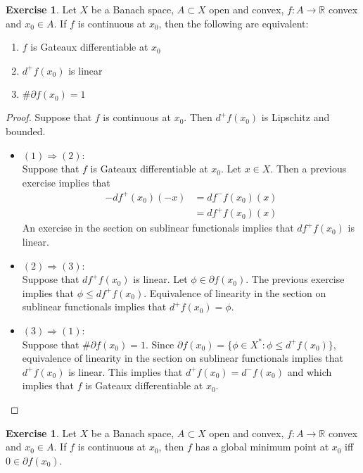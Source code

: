 \documentclass[12pt]{amsart}
\theoremstyle{definition}
\theoremstyle{remark}
\theoremstyle{definition}
\newtheorem{ex}[definition]{Exercise}
\newcommand{\R}{\mathbb{R}}
\newcommand{\p}{\partial}
\begin{document}
	\begin{ex}
	Let $X$ be a Banach space, $A \subset X$ open and convex, $f:A \rightarrow \R$ convex and $x_0 \in A$. If $f$ is continuous at $x_0$, then the following are equivalent:
	\begin{enumerate}
	\item $f$ is Gateaux differentiable at $x_0$    
	\item $d^+f(x_0)$ is linear 
	\item $\# \p f(x_0) = 1$
	\end{enumerate}
	\end{ex}	
	
	\begin{proof}
	Suppose that $f$ is continuous at $x_0$. Then $d^+f(x_0)$ is Lipschitz and bounded.
	\begin{itemize}
	\item $(1) \Rightarrow (2)$: \\ 
	Suppose that $f$ is Gateaux differentiable at $x_0$. Let $x \in X$. Then a previous exercise implies that 
	\begin{align*}
	-df^+(x_0)(-x) 
	&= df^-f(x_0)(x) \\
	&= df^+f(x_0)(x)
	\end{align*}
	An exercise in the section on sublinear functionals implies that $df^+f(x_0)$ is linear.
	\item $(2) \Rightarrow (3)$: \\  
	Suppose that $df^+f(x_0)$ is linear. Let $\phi \in \p f(x_0)$. The previous exercise implies that $\phi \leq df^+f(x_0)$. Equivalence of linearity in the section on sublinear functionals implies that $d^+f(x_0) = \phi$. 
	\item $(3) \Rightarrow (1)$: \\  
	Suppose that $\# \p f(x_0) = 1$. Since $\p f(x_0) = \{ \phi \in X^*: \phi \leq d^+ f(x_0) \}$, equivalence of linearity in the section on sublinear functionals implies that $d^+ f(x_0)$ is linear. This implies that $d^+ f(x_0) = d^- f(x_0)$ and which implies that $f$ is Gateaux differentiable at $x_0$.
	\end{itemize}
	\end{proof}
	
	\begin{ex}
	Let $X$ be a Banach space, $A \subset X$ open and convex, $f:A \rightarrow \R$ convex and $x_0 \in A$. If $f$ is continuous at $x_0$, then $f$ has a global minimum point at $x_0$ iff $0 \in \p f(x_0)$.
	\end{ex}
	
\end{document}
